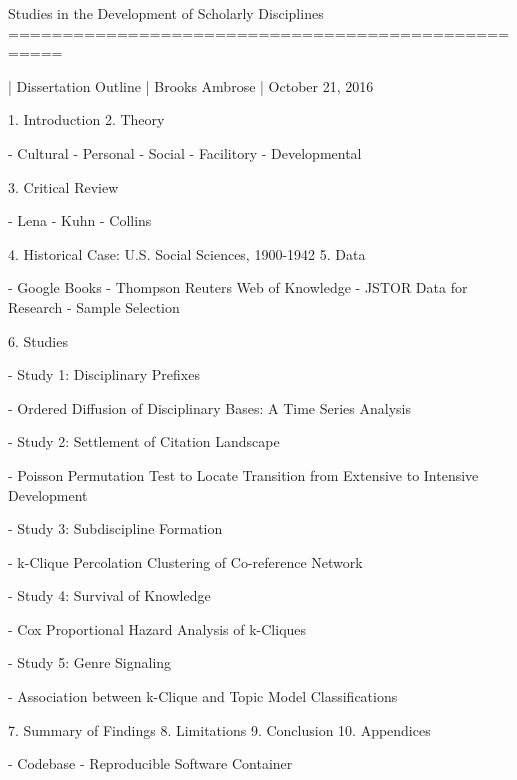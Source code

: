 Studies in the Development of Scholarly Disciplines
===================================================

| Dissertation Outline
| Brooks Ambrose
| October 21, 2016

1. Introduction
2. Theory

-  Cultural
-  Personal
-  Social
-  Facilitory
-  Developmental

3. Critical Review

-  Lena
-  Kuhn
-  Collins

4. Historical Case: U.S. Social Sciences, 1900-1942
5. Data

-  Google Books
-  Thompson Reuters Web of Knowledge
-  JSTOR Data for Research
-  Sample Selection

6. Studies

-  Study 1: Disciplinary Prefixes

   -  Ordered Diffusion of Disciplinary Bases: A Time Series Analysis

-  Study 2: Settlement of Citation Landscape

   -  Poisson Permutation Test to Locate Transition from Extensive to
      Intensive Development

-  Study 3: Subdiscipline Formation

   -  k-Clique Percolation Clustering of Co-reference Network

-  Study 4: Survival of Knowledge

   -  Cox Proportional Hazard Analysis of k-Cliques

-  Study 5: Genre Signaling

   -  Association between k-Clique and Topic Model Classifications

7.  Summary of Findings
8.  Limitations
9.  Conclusion
10. Appendices

-  Codebase
-  Reproducible Software Container
